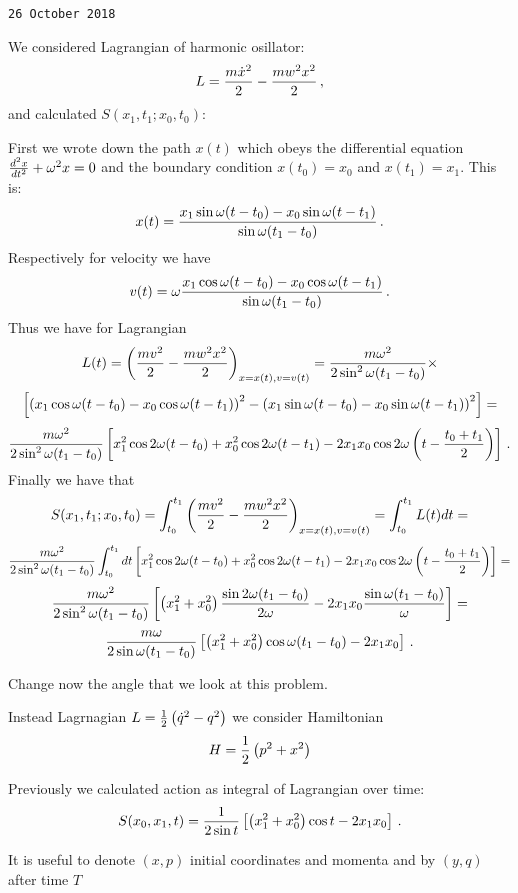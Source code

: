 {\tt


{\tt 26 October 2018}

  We considered Lagrangian of harmonic osillator:
        $$
  L={m\dot x^2\over 2}-{mw^2x^2\over 2}\,,
         $$
and calculated $S(x_1,t_1;x_0,t_0)$:
        
First we wrote down the path  $x(t)$
which obeys the differential equation ${d^2 x\over dt^2}+{\omega}^2 x=0$
and the boundary condition
      $x(t_0)=x_0$ and $x(t_1)=x_1$. This is:
       $$
x(t)={
   x_1\sin {\omega} (t-t_0)
       - 
  x_0\sin {\omega} (t-t_1)
    \over
        \sin {\omega} (t_1-t_0)
       }\,.
       $$
Respectively for velocity  we have
    $$
v(t)={\omega}{
   x_1\cos {\omega} (t-t_0)
       - 
  x_0\cos {\omega} (t-t_1)
    \over
        \sin {\omega} (t_1-t_0)
       }\,.
       $$
Thus we have  for Lagrangian
      $$
L(t)=
  \left(
 {m v^2\over 2}-{mw^2x^2\over 2}
    \right)_{x=x(t),v=v(t)}=
     {m{\omega}^2\over 2\sin^2{\omega}(t_1-t_0)}
      \times
      $$
          $$
       \left[
     \left(
        x_1\cos {\omega} (t-t_0)
       -
        x_0\cos {\omega} (t-t_1)
       \right)^2
          -
      \left(
        x_1\sin {\omega} (t-t_0)
       -
        x_0\sin {\omega} (t-t_1)
       \right)^2
      \right]
       =
       $$
$$
     {m{\omega}^2\over 2\sin^2{\omega}(t_1-t_0)}
       \left[
    x_1^2\cos 2{\omega} (t-t_0)
    +
    x_0^2\cos 2{\omega} (t-t_1)
         -2x_1x_0
       \cos
       2{\omega}
      \left(
       t-{t_0+t_1\over 2}
        \right)
       \right]\,.
$$
Finally we have
that
       $$
    S(x_1,t_1;x_0,t_0)=
       \int_{t_0}^{t_1}
   \left(
 {m v^2\over 2}-{mw^2x^2\over 2}
    \right)_{x=x(t),v=v(t)}         
       =\int_{t_0}^{t_1}L(t)dt=
       $$
 $$
     {m{\omega}^2\over 2\sin^2{\omega}(t_1-t_0)}
        \int_{t_0}^{t_1}
       dt
       \left[
    x_1^2\cos 2{\omega} (t-t_0)
    +
    x_0^2\cos 2{\omega} (t-t_1)
         -2x_1x_0
       \cos
       2{\omega}
      \left(
       t-{t_0+t_1\over 2}
        \right)
       \right]=
$$  
   $$ 
     {m{\omega}^2\over 2\sin^2{\omega}(t_1-t_0)}
       \left[
    \left(x_1^2+x_0^2\right)
      {\sin 2{\omega} (t_1-t_0)\over 2{\omega}}
    -           
         2x_1x_0
      {\sin {\omega} (t_1-t_0)\over {\omega}}
       \right]=
     $$
         $$ 
     {m{\omega}\over 2\sin{\omega}(t_1-t_0)}
       \left[
    \left(x_1^2+x_0^2\right)
      \cos {\omega} (t_1-t_0)
                -           
         2x_1x_0
       \right]\,.
     $$
}

   Change now the angle that we look at this problem.

 Instead Lagrnagian $L={1\over 2}\left(\dot q^2-q^2\right)$
we consider Hamiltonian
              $$
      H={1\over 2}\left(p^2+x^2\right)
               $$     

Previously we calculated action as integral of Lagrangian over time:
               $$
   S(x_0,x_1,t)=      
     {1\over 2\sin t}
       \left[
    \left(x_1^2+x_0^2\right)
      \cos t
                -           
         2x_1x_0
       \right]\,.
               $$
     
It is useful to denote $(x,p)$ initial coordinates and momenta 
  and by $(y,q)$ after time $T$

\bye
